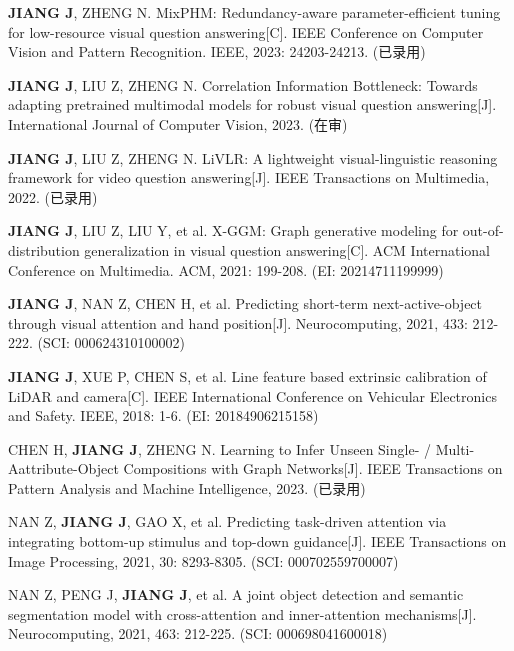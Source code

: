 

\begin{achievelist}
\item \textbf{JIANG J}, ZHENG N. MixPHM: Redundancy-aware parameter-efficient tuning for low-resource visual question answering[C]. IEEE Conference on Computer Vision and Pattern Recognition. IEEE, 2023: 24203-24213. 
(已录用)

\item \textbf{JIANG J}, LIU Z, ZHENG N. Correlation Information Bottleneck: Towards adapting pretrained multimodal models for robust visual question answering[J]. International Journal of Computer Vision, 2023. 
(在审)

\item \textbf{JIANG J}, LIU Z, ZHENG N. LiVLR: A lightweight visual-linguistic reasoning framework for video question answering[J]. IEEE Transactions on Multimedia, 2022. 
(已录用)

\item \textbf{JIANG J}, LIU Z, LIU Y, et al. X-GGM: Graph generative modeling for out-of-distribution generalization in visual question answering[C]. ACM International Conference on Multimedia. ACM, 2021: 199-208. 
(EI: 20214711199999)

\item \textbf{JIANG J}, NAN Z, CHEN H, et al. Predicting short-term next-active-object through visual attention and hand position[J]. Neurocomputing, 2021, 433: 212-222. 
(SCI: 000624310100002)

\item \textbf{JIANG J}, XUE P, CHEN S, et al. Line feature based extrinsic calibration of LiDAR and camera[C]. IEEE International Conference on Vehicular Electronics and Safety. IEEE, 2018: 1-6. 
(EI: 20184906215158) 

\item CHEN H, \textbf{JIANG J}, ZHENG N. Learning to Infer Unseen Single- / Multi-Aattribute-Object Compositions with Graph Networks[J]. IEEE Transactions on Pattern Analysis and Machine Intelligence, 2023. 
(已录用)

\item NAN Z, \textbf{JIANG J}, GAO X, et al. Predicting task-driven attention via integrating bottom-up stimulus and top-down guidance[J]. IEEE Transactions on Image Processing, 2021, 30: 8293-8305. 
(SCI: 000702559700007)

\item NAN Z, PENG J, \textbf{JIANG J}, et al. A joint object detection and semantic segmentation model with cross-attention and inner-attention mechanisms[J]. Neurocomputing, 2021, 463: 212-225. 
(SCI: 000698041600018)

\end{achievelist}



